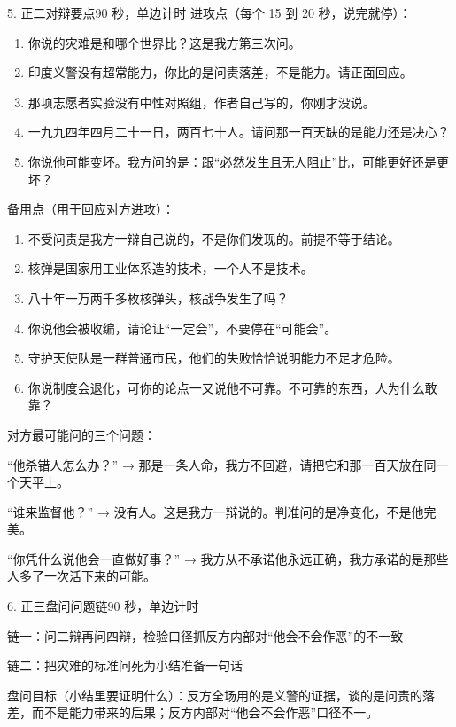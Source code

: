 \documentclass[script,pro]{debate}
\begin{document}
\begin{stage}{5. 正二对辩要点}{90 秒，单边计时}
进攻点（每个 15 到 20 秒，说完就停）：

\begin{enumerate}[leftmargin=1.8em,itemsep=2pt,topsep=2pt]
\item 你说的灾难是和哪个世界比？这是我方第三次问。
\item 印度义警没有超常能力，你比的是问责落差，不是能力。请正面回应。
\item 那项志愿者实验没有中性对照组，作者自己写的，你刚才没说。
\item 一九九四年四月二十一日，两百七十人。请问那一百天缺的是能力还是决心？
\item 你说他可能变坏。我方问的是：跟“必然发生且无人阻止”比，可能更好还是更坏？
\end{enumerate}
备用点（用于回应对方进攻）：

\begin{enumerate}[leftmargin=1.8em,itemsep=2pt,topsep=2pt]
\item 不受问责是我方一辩自己说的，不是你们发现的。前提不等于结论。
\item 核弹是国家用工业体系造的技术，一个人不是技术。
\item 八十年一万两千多枚核弹头，核战争发生了吗？
\item 你说他会被收编，请论证“一定会”，不要停在“可能会”。
\item 守护天使队是一群普通市民，他们的失败恰恰说明能力不足才危险。
\item 你说制度会退化，可你的论点一又说他不可靠。不可靠的东西，人为什么敢靠？
\end{enumerate}
对方最可能问的三个问题：

\begin{bullets}
\item “他杀错人怎么办？” → 那是一条人命，我方不回避，请把它和那一百天放在同一个天平上。
\item “谁来监督他？” → 没有人。这是我方一辩说的。判准问的是净变化，不是他完美。
\item “你凭什么说他会一直做好事？” → 我方从不承诺他永远正确，我方承诺的是那些人多了一次活下来的可能。
\end{bullets}
\end{stage}
\begin{stage}{6. 正三盘问问题链}{90 秒，单边计时}
\begin{chain}{链一：问二辩再问四辩，检验口径}{抓反方内部对“他会不会作恶”的不一致}
\end{chain}
\begin{chain}{链二：把灾难的标准问死}{为小结准备一句话}
\end{chain}
盘问目标（小结里要证明什么）：反方全场用的是义警的证据，谈的是问责的落差，而不是能力带来的后果；反方内部对“他会不会作恶”口径不一。

\end{stage}
\end{document}
